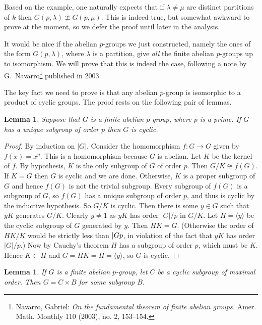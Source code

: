 \documentclass[11pt,oneside]{article}
\newtheorem{lem}[thm]{Lemma}
\theoremstyle{definition}
\newcommand{\gen}[1]{\langle #1 \rangle}
\begin{document}
Based on the example, one naturally expects that if $\lambda \ne \mu$
are distinct partitions of $k$ then $G(p,\lambda) \ncong
G(p,\mu)$. This is indeed true, but somewhat awkward to prove at the
moment, so we defer the proof until later in the analysis.

It would be nice if the abelian $p$-groups we just constructed, namely
the ones of the form $G(p, \lambda)$, where $\lambda$ is a partition,
give \emph{all} the finite abelian $p$-groups up to isomorphism. We
will prove that this is indeed the case, following a note by
G.~Navarro\footnote{Navarro, Gabriel: \emph{On the fundamental theorem
    of finite abelian groups.}  Amer. Math. Monthly 110 (2003), no. 2,
  153--154.} published in 2003. 

The key fact we need to prove is that any abelian $p$-group is
isomorphic to a product of cyclic groups. The proof rests on the
following pair of lemmas.


\begin{lem}\label{lem:A}
  Suppose that $G$ is a finite abelian $p$-group, where $p$ is a
  prime. If $G$ has a unique subgroup of order $p$ then $G$ is cyclic.
\end{lem}

\begin{proof}
By induction on $|G|$. Consider the homomorphism $f: G \to G$ given by
$f(x) = x^p$. This is a homomorphism because $G$ is abelian. Let $K$
be the kernel of $f$. By hypothesis, $K$ is the only subgroup of $G$
of order $p$. Then $G/K \cong f(G)$. If $K=G$ then $G$ is cyclic and
we are done. Otherwise, $K$ is a proper subgroup of $G$ and hence
$f(G)$ is not the trivial subgroup. Every subgroup of $f(G)$ is a
subgroup of $G$, so $f(G)$ has a unique subgroup of order $p$, and
thus is cyclic by the inductive hypothesis. So $G/K$ is cyclic. Then
there is some $y \in G$ such that $yK$ generates $G/K$. Clearly $y \ne
1$ as $yK$ has order $|G|/p$ in $G/K$. Let $H = \gen{y}$ be the cyclic
subgroup of $G$ generated by $y$. Then $HK = G$. (Otherwise the order
of $HK/K$ would be strictly less than $|G\/p$, in violation of the
fact that $yK$ has order $|G|/p$.)  Now by Cauchy's theorem $H$ has a
subgroup of order $p$, which must be $K$. Hence $K \subset H$ and $G =
HK = H = \gen{y}$, so $G$ is cyclic.
\end{proof}


\begin{lem}\label{lem:B}
  If $G$ is a finite abelian $p$-group, let $C$ be a cyclic subgroup
  of maximal order. Then $G = C \times B$ for some subgroup $B$.
\end{lem}
\end{document}
